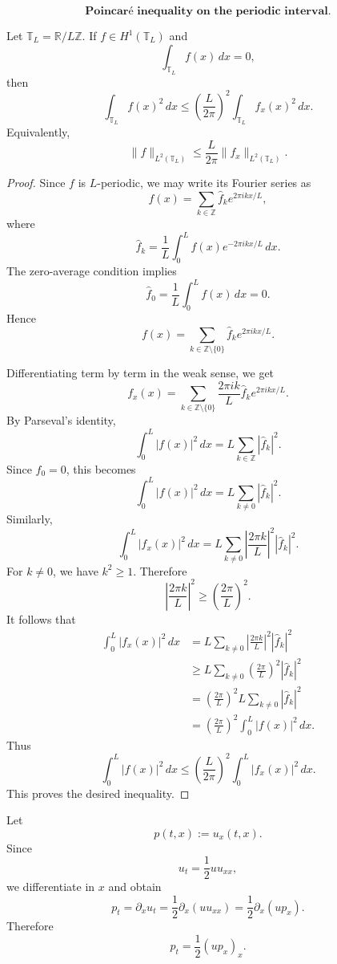 \begin{proposition}
    \[
\textbf{Poincaré inequality on the periodic interval.}
\]

Let \(\mathbb T_L=\mathbb R/L\mathbb Z\). If \(f\in H^1(\mathbb T_L)\) and
\[
\int_{\mathbb T_L} f(x)\,dx=0,
\]
then
\[
\boxed{
\int_{\mathbb T_L} f(x)^2\,dx
\le
\left(\frac{L}{2\pi}\right)^2
\int_{\mathbb T_L} f_x(x)^2\,dx.
}
\]
Equivalently,
\[
\boxed{
\|f\|_{L^2(\mathbb T_L)}
\le
\frac{L}{2\pi}
\|f_x\|_{L^2(\mathbb T_L)}.
}
\]
\end{proposition}
\begin{proof}
Since \(f\) is \(L\)-periodic, we may write its Fourier series as
\[
f(x)=\sum_{k\in\mathbb Z}\widehat f_k e^{2\pi i kx/L},
\]
where
\[
\widehat f_k
=
\frac1L\int_0^L f(x)e^{-2\pi i kx/L}\,dx.
\]
The zero-average condition implies
\[
\widehat f_0
=
\frac1L\int_0^L f(x)\,dx
=
0.
\]
Hence
\[
f(x)=\sum_{k\in\mathbb Z\setminus\{0\}}
\widehat f_k e^{2\pi i kx/L}.
\]

Differentiating term by term in the weak sense, we get
\[
f_x(x)
=
\sum_{k\in\mathbb Z\setminus\{0\}}
\frac{2\pi i k}{L}
\widehat f_k e^{2\pi i kx/L}.
\]
By Parseval's identity,
\[
\int_0^L |f(x)|^2\,dx
=
L\sum_{k\in\mathbb Z}|\widehat f_k|^2.
\]
Since \(\widehat f_0=0\), this becomes
\[
\int_0^L |f(x)|^2\,dx
=
L\sum_{k\neq 0}|\widehat f_k|^2.
\]
Similarly,
\[
\int_0^L |f_x(x)|^2\,dx
=
L\sum_{k\neq 0}
\left|\frac{2\pi k}{L}\right|^2
|\widehat f_k|^2.
\]
For \(k\neq 0\), we have \(k^2\ge 1\). Therefore
\[
\left|\frac{2\pi k}{L}\right|^2
\ge
\left(\frac{2\pi}{L}\right)^2.
\]
It follows that
\[
\begin{aligned}
\int_0^L |f_x(x)|^2\,dx
&=
L\sum_{k\neq 0}
\left|\frac{2\pi k}{L}\right|^2
|\widehat f_k|^2 \\
&\ge
L\sum_{k\neq 0}
\left(\frac{2\pi}{L}\right)^2
|\widehat f_k|^2 \\
&=
\left(\frac{2\pi}{L}\right)^2
L\sum_{k\neq 0}|\widehat f_k|^2 \\
&=
\left(\frac{2\pi}{L}\right)^2
\int_0^L |f(x)|^2\,dx.
\end{aligned}
\]
Thus
\[
\int_0^L |f(x)|^2\,dx
\le
\left(\frac{L}{2\pi}\right)^2
\int_0^L |f_x(x)|^2\,dx.
\]
This proves the desired inequality.
\end{proof}

\begin{proposition}
\end{proposition}
Let
\[
p(t,x):=u_x(t,x).
\]
Since
\[
u_t=\frac12 u u_{xx},
\]
we differentiate in \(x\) and obtain
\[
p_t
=
\partial_x u_t
=
\frac12 \partial_x(u u_{xx})
=
\frac12 \partial_x(u p_x).
\]
Therefore
\[
\boxed{
p_t=\frac12 (u p_x)_x.
}
\]

